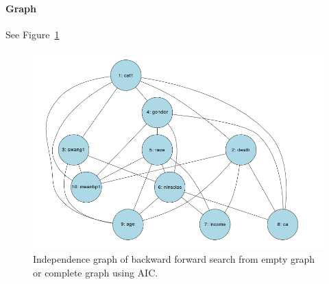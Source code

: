\documentclass[12pt]{article}
\theoremstyle{definition}
\begin{document}
\paragraph{Graph} See Figure~\ref{fig:f}

\begin{figure}[H]
    \centering
    \includegraphics[width=0.8\linewidth]{f.png}
    \caption{Independence graph of backward forward search from empty graph or complete graph using AIC.}
\label{fig:f}
\end{figure}




\end{document}
